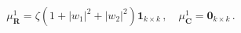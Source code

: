 \begin{equation}
  \mu^{1}_{\mathbf{R}}=\zeta (1+|w_1|^2 +|w_2|^2)\mathbf{1}_{k\times k}\,,
\quad \mu^1_{\mathbf{C}}=\mathbf{0}_{k\times k}\,.\label{eq:4.2.2}
\end{equation}

